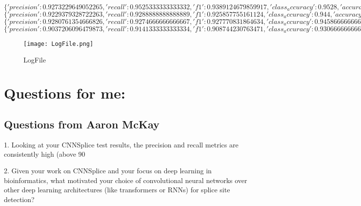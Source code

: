$\{'precision': 0.9273229649052265, 'recall': 0.9525333333333332, 'f1': 0.9389124679859917, 'class_accuracy': 0.9528, 'accuracy': 0.9527999758720398\}$\\

$\{'precision': 0.9229379328722263, 'recall': 0.9288888888888889, 'f1': 0.925857755161124, 'class_accuracy': 0.944, 'accuracy': 0.9440000057220459\}$\\

$\{'precision': 0.9280761354666826, 'recall': 0.9274666666666667, 'f1': 0.927770831864634, 'class_accuracy': 0.9458666666666666, 'accuracy': 0.9458666443824768\}$\\

$\{'precision': 0.9037206096479873, 'recall': 0.9141333333333334, 'f1': 0.908744230763471, 'class_accuracy': 0.9306666666666666, 'accuracy': 0.9306666851043701\}$

\begin{figure}[h!]
    \centering
    \texttt{[image: LogFile.png]}
    \caption{LogFile}
    \label{fig:enter-label}
\end{figure}


\section{Questions for me:}

\subsection{Questions from Aaron McKay}
1. Looking at your CNNSplice test results, the precision and recall metrics are consistently high (above 90%

2. Given your work on CNNSplice and your focus on deep learning in bioinformatics, what motivated your choice of convolutional neural networks over other deep learning architectures (like transformers or RNNs) for splice site detection?